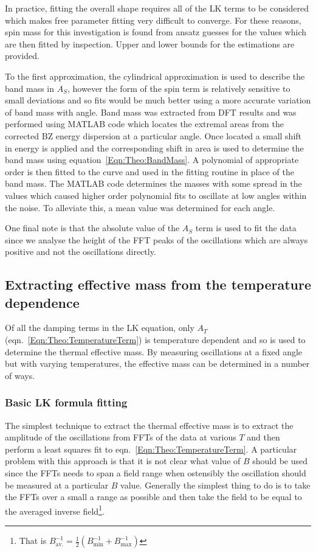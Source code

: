 In practice, fitting the overall shape requires all of the \ac{LK} terms to be considered which makes free parameter fitting very difficult to converge. For these reasons, spin mass for this investigation is found from ansatz guesses for the values which are then fitted by inspection. Upper and lower bounds for the estimations are provided.

To the first approximation, the cylindrical approximation is used to describe the band mass in $A_S$, however the form of the spin term is relatively sensitive to small deviations and so fits would be much better using a more accurate variation of band mass with angle. Band mass was extracted from \ac{DFT} results and was performed using MATLAB code which locates the extremal areas from the corrected \ac{BZ} energy dispersion at a particular angle. Once located a small shift in energy is applied and the corresponding shift in area is used to determine the band mass using equation~\ref{Eqn:Theo:BandMass}. A polynomial of appropriate order is then fitted to the curve and used in the fitting routine in place of the band mass. The MATLAB code determines the masses with some spread in the values which caused higher order polynomial fits to oscillate at low angles within the noise. To alleviate this, a mean value was determined for each angle.

One final note is that the absolute value of the $A_S$ term is used to fit the data since we analyse the height of the \ac{FFT} peaks of the oscillations which are always positive and not the oscillations directly.

\subsection{Extracting effective mass from the temperature dependence}
\label{Sec:Exp:ExtractingEffMassTemperatureDependence}

Of all the damping terms in the \ac{LK} equation, only $A_T$ (eqn.~\ref{Eqn:Theo:TemperatureTerm}) is temperature dependent and so is used to determine the thermal effective mass. By measuring oscillations at a fixed angle but with varying temperatures, the effective mass can be determined in a number of ways.

\subsubsection{Basic \ac{LK} formula fitting}

The simplest technique to extract the thermal effective mass is to extract the amplitude of the oscillations from \acp{FFT} of the data at various $T$ and then perform a least squares fit to eqn.~\ref{Eqn:Theo:TemperatureTerm}. A particular problem with this approach is that it is not clear what value of $B$ should be used since the \acp{FFT} needs to span a field range when ostensibly the oscillation should be measured at a particular $B$ value. Generally the simplest thing to do is to take the \acp{FFT} over a small a range as possible and then take the field to be equal to the averaged inverse field\footnote{That is $B_{\textrm{av.}}^{-1} = \frac{1}{2}(B_{\textrm{min}}^{-1} + B_{\textrm{max}}^{-1})$}. 

